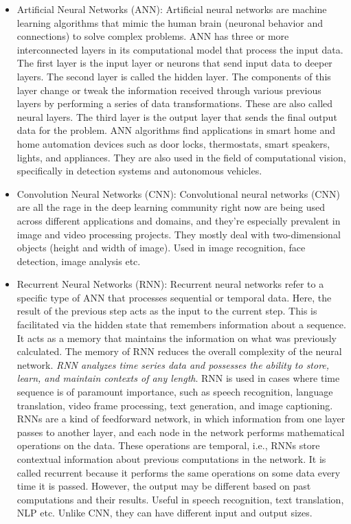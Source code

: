 \documentclass[11pt]{article}
\begin{document}
\begin{itemize}
\item Artificial Neural Networks (ANN): Artificial neural networks are machine learning algorithms that mimic the human brain (neuronal behavior and connections) to solve complex problems. ANN has three or more interconnected layers in its computational model that process the input data. The first layer is the input layer or neurons that send input data to deeper layers. The second layer is called the hidden layer. The components of this layer change or tweak the information received through various previous layers by performing a series of data transformations. These are also called neural layers. The third layer is the output layer that sends the final output data for the problem. ANN algorithms find applications in smart home and home automation devices such as door locks, thermostats, smart speakers, lights, and appliances. They are also used in the field of computational vision, specifically in detection systems and autonomous vehicles.
\item Convolution Neural Networks (CNN): Convolutional neural networks (CNN) are all the rage in the deep learning community right now are being used across different applications and domains, and they’re especially prevalent in image and video processing projects. They mostly deal with two-dimensional objects (height and width of image). Used in image recognition, face detection, image analysis etc. 
\item Recurrent Neural Networks (RNN): Recurrent neural networks refer to a specific type of ANN that processes sequential or temporal data. Here, the result of the previous step acts as the input to the current step. This is facilitated via the hidden state that remembers information about a sequence. It acts as a memory that maintains the information on what was previously calculated. The memory of RNN reduces the overall complexity of the neural network. \emph{RNN analyzes time series data and possesses the ability to store, learn, and maintain contexts of any length}. RNN is used in cases where time sequence is of paramount importance, such as speech recognition, language translation, video frame processing, text generation, and image captioning. RNNs are a kind of feedforward network, in which information from one layer passes to another layer, and each node in the network performs mathematical operations on the data. These operations are temporal, i.e., RNNs store contextual information about previous computations in the network. It is called recurrent because it performs the same operations on some data every time it is passed. However, the output may be different based on past computations and their results.
Useful in speech recognition, text translation, NLP etc. Unlike CNN, they can have different input and output sizes. 


\end{itemize} 
\end{document}
